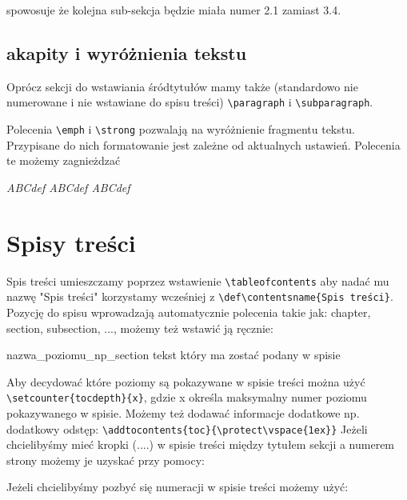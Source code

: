 \documentclass[fontSize=10pt,extra]{pdfArticle}
\begin{document}
spowosuje że kolejna sub-sekcja będzie miała numer 2.1 zamiast 3.4.

\subsection{akapity i wyróżnienia tekstu}

Oprócz sekcji do wstawiania śródtytułów mamy także (standardowo nie numerowane i nie wstawiane do spisu treści) \Verb$\paragraph$ i \Verb$\subparagraph$.

Polecenia \Verb$\emph$ i \Verb$\strong$ pozwalają na wyróżnienie fragmentu tekstu.
Przypisane do nich formatowanie jest zależne od aktualnych ustawień.
Polecenia te możemy zagnieżdzać

\begin{Example}
\emfontdeclare{\itshape,\upshape\scshape,\slshape}
\emph{ABCdef \emph{ABCdef \emph{ABCdef}}}

\strongfontdeclare{\bfseries,\color{red}}
\end{Example}

\vspace{8pt}
\section{Spisy treści}
Spis treści umieszczamy poprzez wstawienie \Verb$\tableofcontents$ aby nadać mu nazwę "Spis treści" korzystamy wcześniej z \Verb$\def\contentsname{Spis treści}$. Pozycję do spisu wprowadzają automatycznie polecenia takie jak: chapter, section, subsection, ..., możemy też wstawić ją ręcznie:
\begin{MintedCode}
    {nazwa_poziomu_np_section}  {tekst który ma zostać podany w spisie}
\end{MintedCode}
Aby decydować które poziomy są pokazywane w spisie treści można użyć \Verb$\setcounter{tocdepth}{x}$, gdzie x określa maksymalny numer poziomu pokazywanego w spisie.
Możemy też dodawać informacje dodatkowe np. dodatkowy odstęp: \Verb$\addtocontents{toc}{\protect\vspace{1ex}}$
Jeżeli chcielibyśmy mieć kropki (....) w spisie treści między tytułem sekcji a numerem strony możemy je uzyskać przy pomocy:
\begin{MintedCode}
\makeatletter   \renewcommand*{}  \makeatother
\end{MintedCode}
Jeżeli chcielibyśmy pozbyć się numeracji w spisie treści możemy użyć:
\begin{MintedCode}
\makeatletter  \renewcommand*{} \makeatother
\end{MintedCode}
\end{document}
